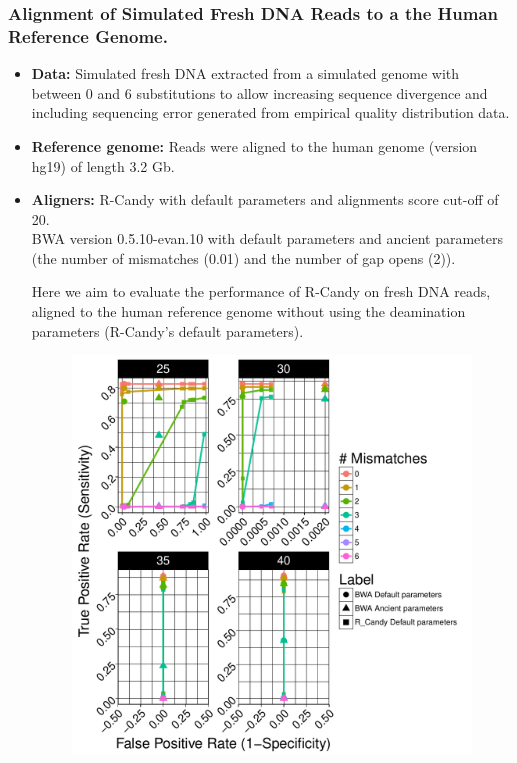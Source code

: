 \documentclass[11pt,a4paper]{report}
\begin{document}

\subsubsection{ Alignment of Simulated Fresh DNA Reads to a the Human Reference Genome.}
\label{ Alignment of Simulated Fresh DNA Reads to a the Human Reference Genome.}

 \begin{itemize}
 
   \item \textbf{Data:} Simulated fresh DNA extracted from a simulated genome 
   with between 0 and 6 substitutions to allow increasing sequence divergence
   and including sequencing error generated from empirical quality distribution data.
   
   \item \textbf{Reference genome:} Reads were aligned to the human genome (version hg19) of length 3.2 Gb.

    \item \textbf{Aligners:} 
R-Candy with default parameters and alignments score cut-off of 20. \\
BWA version 0.5.10-evan.10 with default parameters and ancient parameters 
\cite{green2010draft} (the number of mismatches 
(0.01) and the number of gap opens (2)).


Here we aim to evaluate the performance of R-Candy on fresh DNA reads, 
aligned to the human reference genome without using the deamination parameters  
(R-Candy's default parameters).


\begin{figure}[H]
\centering
\includegraphics[width=12cm]{pictures/bROC_DS6_emp.pdf}


\end{figure}
\end{itemize}
\end{document}
